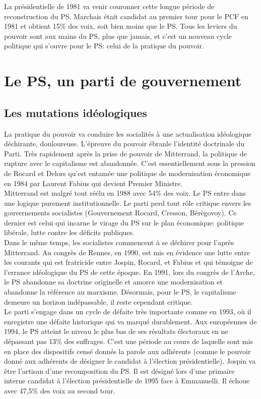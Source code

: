 \documentclass[10pt, a4paper, openany]{book}
\begin{document}
La présidentielle de 1981 va venir couronner cette longue période de reconstruction du PS. Marchais était candidat au premier tour pour le PCF en 1981 et obtient 15\% des voix, soit bien moins que le PS. Tous les leviers du pouvoir sont aux mains du PS, plus que jamais, et c'est un nouveau cycle politique qui s'ouvre pour le PS: celui de la pratique du pouvoir. 

\section{Le PS, un parti de gouvernement}

\subsection{Les mutations idéologiques}

La pratique du pouvoir va conduire les socialités à une actualisation idéologique déchirante, douloureuse. L'épreuve du pouvoir ébranle l'identité doctrinale du Parti. Très rapidement après la prise de pouvoir de Mitterrand, la politique de rupture avec le capitalisme est abandonnée. C'est essentiellement sous la pression de Rocard et Delors qu'est entamée une politique de modernisation économique en 1984 par Laurent Fabius qui devient Premier Ministre. \\
Mitterrand est malgré tout réélu en 1988 avec 54\% des voix. Le PS entre dans une logique purement institutionnelle. Le parti perd tout rôle critique envers les gouvernements socialistes (Gouvernement Rocard, Cresson, Bérègovoy). Ce dernier est celui qui incarne le virage du PS sur le plan économique: politique libérale, lutte contre les déficits publiques. \\
Dans le même temps, les socialistes commencent à se déchirer pour l'après Mitterrand. Au congrès de Rennes, en 1990, est mis en évidence une lutte entre les courants qui est fratricide entre Jospin, Rocard, et Fabius et qui témoigne de l'errance idéologique du PS de cette époque. En 1991, lors du congrès de l'Arche, le PS abandonne sa doctrine originelle et amorce une modernisation et abandonne la référence au marxisme. Désormais, pour le PS, le capitalisme demeure un horizon indépassable, il reste cependant critique. \\
Le parti s'engage dans un cycle de défaite très importante comme en 1993, où il enregistre une défaite historique qui va marqué durablement. Aux européennes de 1994, le PS atteint le niveau le plus bas de ses résultats électoraux en ne dépassant pas 13\% des suffrages. C'est une période au cours de laquelle sont mis en place des dispositifs censé donnés la parole aux adhérents (comme le pouvoir donné aux adhérents de désigner le candidat à l'élection présidentielle). Jospin va être l'artisan d'une recomposition du PS. Il est désigné lors d'une primaire interne candidat à l'élection présidentielle de 1995 face à Emmanuelli. Il échoue avec 47,5\% des voix au second tour.
\end{document}

